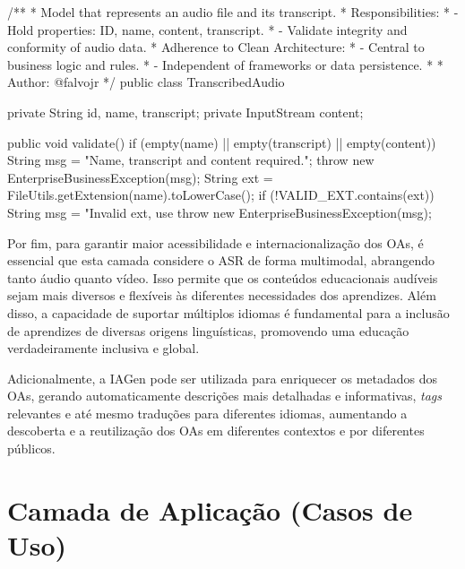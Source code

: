 \begin{codigo}[caption={Exemplo Camada de Entidades: Disponível em \url{https://bit.ly/S2L-Entity}}, label={codigo:exemplo-camada1}, language=Java, breaklines=true]
/**
 * Model that represents an audio file and its transcript.
 * Responsibilities:
 * - Hold properties: ID, name, content, transcript.
 * - Validate integrity and conformity of audio data.
 * Adherence to Clean Architecture:
 * - Central to business logic and rules.
 * - Independent of frameworks or data persistence.
 * 
 * Author: @falvojr
 */
public class TranscribedAudio {
  private String id, name, transcript;
  private InputStream content;

  public void validate() {
    if (empty(name) || empty(transcript) || empty(content)) {
      String msg =  "Name, transcript and content required.";
      throw new EnterpriseBusinessException(msg);
    }
    String ext = FileUtils.getExtension(name).toLowerCase();
    if (!VALID_EXT.contains(ext)) {
      String msg =  "Invalid ext, use %
      throw new EnterpriseBusinessException(msg);
    }
  }
}
\end{codigo}

Por fim, para garantir maior acessibilidade e internacionalização dos OAs, é essencial que esta camada considere o ASR de forma multimodal, abrangendo tanto áudio quanto vídeo. Isso permite que os conteúdos educacionais audíveis sejam mais diversos e flexíveis às diferentes necessidades dos aprendizes. Além disso, a capacidade de suportar múltiplos idiomas é fundamental para a inclusão de aprendizes de diversas origens linguísticas, promovendo uma educação verdadeiramente inclusiva e global.

Adicionalmente, a IAGen pode ser utilizada para enriquecer os metadados dos OAs, gerando automaticamente descrições mais detalhadas e informativas, \textit{tags} relevantes e até mesmo traduções para diferentes idiomas, aumentando a descoberta e a reutilização dos OAs em diferentes contextos e por diferentes públicos.

\section{Camada de Aplicação (Casos de Uso)}


